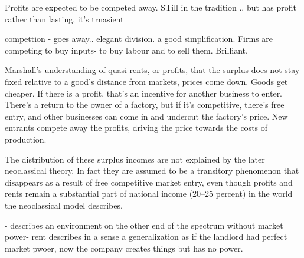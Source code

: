 
 Profits are expected to be competed away.
 STill in the tradition .. but has profit rather than lasting, it's trnasient




compettion - goes away.. elegant division. a good simplification.
Firms are competing to buy inputs- to buy labour and to sell them. Brilliant. 


 Marshall's understanding of quasi-rents, or profits, that the surplus does not stay fixed relative to a good's distance from markets, prices come down. Goods get cheaper. If there is a profit, that's an incentive for another business to enter. There's a return to the owner of a factory, but if it's \gls{competitive}, there's free entry, and other businesses can come in and undercut the factory's price. New entrants compete away the profits, driving the price towards the costs of production.


The distribution of these surplus incomes are not explained by the later neoclassical theory. In fact they are assumed to be a transitory phenomenon that disappears as a result of free competitive market entry, even though profits and rents remain a substantial part of national income (20--25 percent) \cite{GET_Britannica} %
in the world the neoclassical model describes. 

- describes an environment on the other end of the spectrum without market power- rent describes in a sense a generalization as if the landlord had perfect market pwoer, now the company creates things but has no power.



